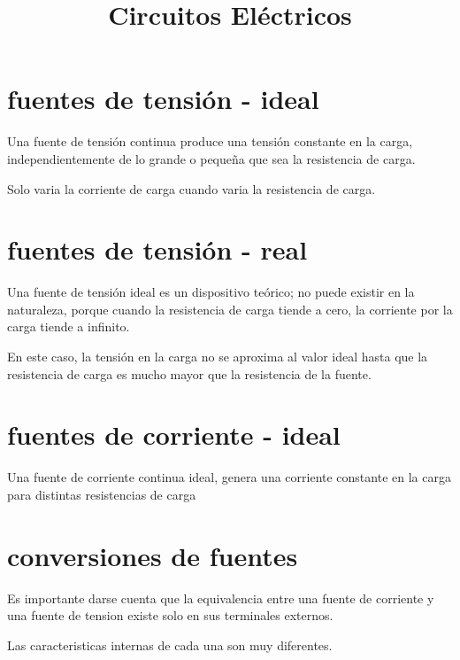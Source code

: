 \title{Circuitos Eléctricos}
\maketitle
\section*{fuentes de tensión - ideal}
\justifying
Una fuente de tensión continua produce una tensión constante en la carga,	independientemente de lo grande o pequeña que sea la resistencia de carga.

Solo varia la corriente de carga cuando varia la resistencia de carga.

\begin{figure}[h]
	\centering
	\label{f:Fuente de tension - Ideal}
\end{figure}

\section*{fuentes de tensión - real}
\justifying
Una fuente de tensión ideal es un dispositivo teórico; no puede existir en la naturaleza, porque cuando la resistencia de carga tiende a cero, la corriente por la carga tiende a infinito.

En este caso, la tensión en la carga no se aproxima al valor ideal hasta que la resistencia de
carga es mucho mayor que la resistencia de la fuente.


\section*{fuentes de corriente - ideal}
\justifying
Una fuente de corriente continua ideal, genera una corriente constante en la carga para distintas resistencias de carga

\section*{conversiones de fuentes}
\justifying
Es importante darse cuenta que la equivalencia entre una fuente de corriente y una fuente de tension existe solo en sus terminales externos.

Las caracteristicas internas de cada una son muy diferentes.

